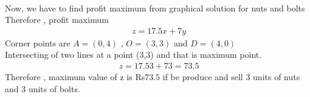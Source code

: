 \documentclass[journal,12pt,twocolumn]{IEEEtran}
\begin{document}
\\
Now, we have to find profit maximum from graphical solution for nuts and bolts
\\
Therefore , profit maximum
\begin{align}
\ z = 17.5{x}+7{y}
\end{align}
Corner points are $A = (0,4)$ , $O = (3,3)$ and $D = (4,0)$
\\
Intersecting of two lines at a point (3,3) and that is maximum point.
\begin{align}
\ z = 17.5{3} + 7{3} = 73.5
\end{align}
Therefore , maximum value of z is Rs$73.5$ if be produce and sell $3$ units of nuts and $3$ units of bolts.
\end{document}
